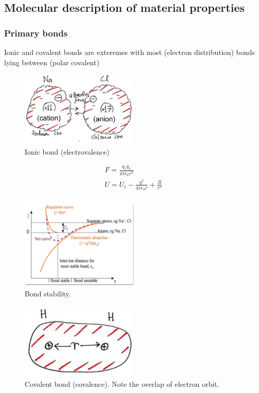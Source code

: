 \subsection{Molecular description of material properties}
\subsubsection{Primary bonds}
Ionic and covalent bonds are exteremes with most (electron distribution) bonds lying between (polar covalent)
\begin{figure}[H]
	\centering
	\includegraphics[width = 0.5\textwidth]{./img/figure7.png}
	\caption{Ionic bond (electrovalence)}
\end{figure}
\begin{gather}
	F = \frac{q_1 q_2}{4\pi \epsilon_0 r^2}\\
	U = U_i - \frac{q^2}{4\pi\epsilon_0 r} + \frac{B}{r^n}
\end{gather}
\begin{figure}[H]
	\centering
	\includegraphics[width = 0.5\textwidth]{./img/figure8.png}
	\caption{Bond stability.}
\end{figure}
\begin{figure}[H]
	\centering
	\includegraphics[width = 0.5\textwidth]{./img/figure9.png}
	\caption{Covalent bond (covalence). Note the overlap of electron orbit.}
\end{figure}

